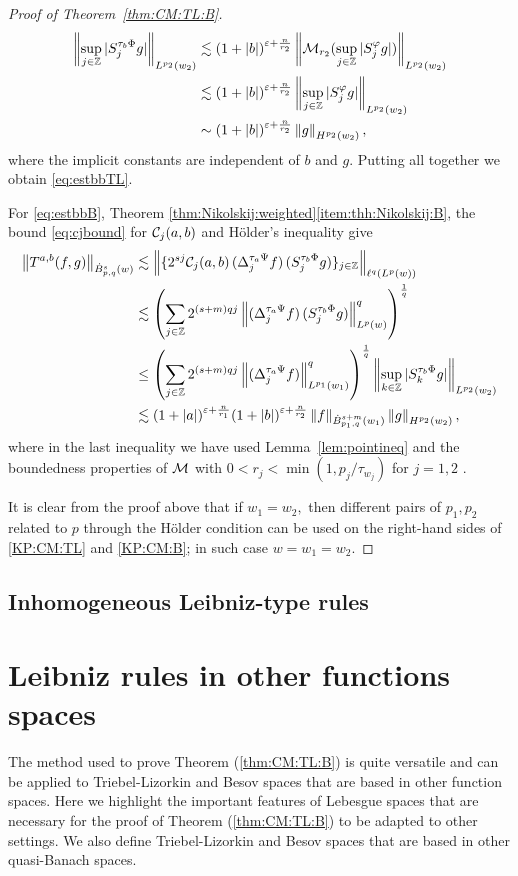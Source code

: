 \begin{proof}[Proof of Theorem~\ref{thm:CM:TL:B}]
\begin{align*}
\left\|\sup_{j\in\mathbb{Z}}|S^{\tau_b\Phi}_{j}g|\right\|_{L^{p_2}(w_2)}&\lesssim (1+\left\vert b \right\vert)^{\varepsilon+\frac{n}{r_2}} \left\|\mathcal{M}_{r_2}(\sup_{j\in\mathbb{Z}}|S^{\varphi}_{j}g|)\right\|_{L^{p_2}(w_2)}\\
&\lesssim (1+\left\vert b \right\vert)^{\varepsilon+\frac{n}{r_2}} \left\|\sup_{j\in\mathbb{Z}}|S^{\varphi}_{j}g|\right\|_{L^{p_2}(w_2)}\\
&\sim (1+\left\vert b \right\vert)^{\varepsilon+\frac{n}{r_2}} \left\|g\right\|_{H^{p_2}(w_2)},
\end{align*}
where the implicit constants are independent of $b$ and $g.$ Putting all together we obtain \eqref{eq:estbbTL}.


For \eqref{eq:estbbB},  Theorem \ref{thm:Nikolskij:weighted}\eqref{item:thh:Nikolskij:B}, the bound \eqref{eq:cjbound} for $\mathcal{C}_j(a,b)$ and H\"older's inequality  give
\begin{align*}
\left\|T^{a,b}(f,g)\right\|_{\dot{B}^s_{p,q}(w)} & \lesssim \left\|\{2^{sj} \mathcal{C}_j(a,b) \,(\Delta^{ \tau_a \Psi }_{j} f ) \, (S^{ \tau_b \Phi }_{j} g)\}_{j\in\mathbb{Z}} \right\|_{\ell^q(L^p(w))}\\
& \lesssim \left(\sum\limits_{j \in \mathbb{Z}}  2^{(s +m) q j}  \left\|(\Delta^{ \tau_a \Psi }_{j} f ) \, (S^{ \tau_b \Phi }_{j} g)\right\|_{L^p(w)}^q   \right)^\frac{1}{q}  \\
&\le  \left(\sum\limits_{j \in \mathbb{Z}}  2^{(s +m) q j}  \left\|(\Delta^{ \tau_a \Psi }_{j} f ) \right\|_{L^{p_1}(w_1)}^q   \right)^\frac{1}{q}  \left\|\sup_{k\in \mathbb{Z}}|S^{ \tau_b \Phi }_{k} g|\right\|_{L^{p_2}(w_2)}\\
& \lesssim  (1+\left\vert a \right\vert)^{\varepsilon+\frac{n}{r_1}}  (1+\left\vert b \right\vert)^{\varepsilon+\frac{n}{r_2}}  \left\|f\right\|_{\dot{B}^{s+m}_{p_1, q}(w_1)} \left\|g\right\|_{H^{p_2}(w_2)},
\end{align*}
where in the last inequality we have used Lemma~\ref{lem:pointineq} and the boundedness properties of $\mathcal{M}$ with  $0<r_j<\min(1,p_j/\tau_{w_j})$ for $j=1,2$ .


It is clear from the proof above that if $w_1=w_2,$ then  different pairs of $p_1, p_2$ related to $p$ through the H\"older condition can be used on the right-hand sides of \eqref{KP:CM:TL} and \eqref{KP:CM:B}; in such case $w=w_1=w_2.$  
\end{proof}

 \subsection{Inhomogeneous Leibniz-type rules}
 
 \section{Leibniz rules in other functions spaces}
 The method used to prove Theorem (\ref{thm:CM:TL:B}) is quite versatile and can be applied to Triebel-Lizorkin and Besov spaces that are based in other function spaces. Here we highlight the important features of Lebesgue spaces that are necessary for the proof of Theorem (\ref{thm:CM:TL:B}) to be adapted to other settings. We also define Triebel-Lizorkin and Besov spaces that are based in other quasi-Banach spaces. 
 
